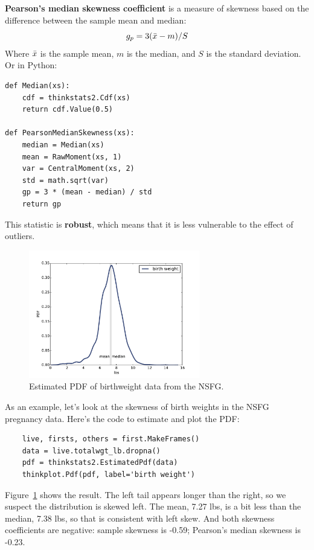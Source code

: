 \documentclass[12pt]{book}
\begin{document}
{\bf Pearson's median skewness coefficient} is a measure
of skewness based on the difference between the
sample mean and median:
%
\[ g_p = 3 (\bar{x} - m) / S \]
%
Where $\bar{x}$ is the sample mean, $m$ is the median, and
$S$ is the standard deviation.  Or in Python:

\begin{verbatim}
def Median(xs):
    cdf = thinkstats2.Cdf(xs)
    return cdf.Value(0.5)

def PearsonMedianSkewness(xs):
    median = Median(xs)
    mean = RawMoment(xs, 1)
    var = CentralMoment(xs, 2)
    std = math.sqrt(var)
    gp = 3 * (mean - median) / std
    return gp
\end{verbatim}

This statistic is {\bf robust}, which means that it is less vulnerable
to the effect of outliers.

\begin{figure}
\centerline{\includegraphics[height=2.2in]{figs/density_totalwgt_kde.pdf}}
\caption{Estimated PDF of birthweight data from the NSFG.}
\label{density_totalwgt_kde}
\end{figure}

As an example, let's look at the skewness of birth weights in the
NSFG pregnancy data.  Here's the code to estimate and plot the PDF:

\begin{verbatim}
    live, firsts, others = first.MakeFrames()
    data = live.totalwgt_lb.dropna()
    pdf = thinkstats2.EstimatedPdf(data)
    thinkplot.Pdf(pdf, label='birth weight')
\end{verbatim}

Figure~\ref{density_totalwgt_kde} shows the result.  The left tail appears
longer than the right, so we suspect the distribution is skewed left.
The mean, 7.27 lbs, is a bit less than
the median, 7.38 lbs, so that is consistent with left skew.
And both skewness coefficients are negative:
sample skewness is -0.59;
Pearson's median skewness is -0.23.
\end{document}
